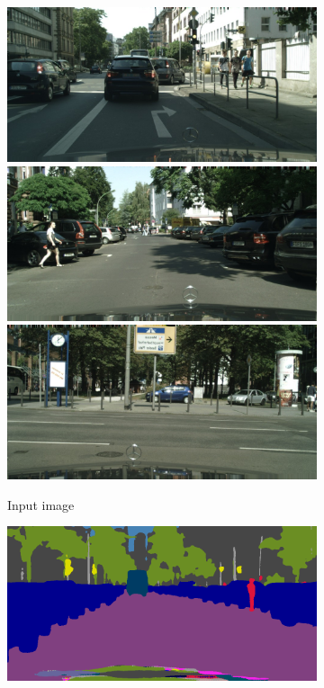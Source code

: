 \begin{figure}[p]
{{\begin{subfigure}[t]{0.24\linewidth}
\begin{center}
		\includegraphics[width=\linewidth,trim={0px 60px 0 0px},clip]{results/segnet_51_output_0.jpg}
		\includegraphics[width=\linewidth,trim={0px 60px 0 0px},clip]{results/segnet_45_output_0.jpg}
		\includegraphics[width=\linewidth,trim={0px 60px 0 0px},clip]{results/segnet_19_output_0.jpg}
  \caption{Input image}
\end{center}
\end{subfigure}
\begin{subfigure}[t]{0.24\linewidth}
\begin{center}
		\includegraphics[width=\linewidth,trim={0px 60px 0 0px},clip]{results/segnet_18_output_1.png}

\end{center}
\end{subfigure}}}
\end{figure}
